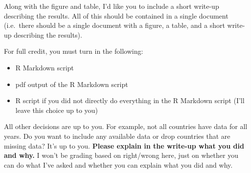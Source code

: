 \documentclass[
]{article}
\providecommand{\tightlist}{%
  \setlength{\itemsep}{0pt}\setlength{\parskip}{0pt}}
\begin{document}
Along with the figure and table, I'd like you to include a short write-up describing the results. All of this should be contained in a single document (i.e.~there should be a single document with a figure, a table, and a short write-up describing the results).

For full credit, you must turn in the following:

\begin{itemize}
\tightlist
\item
  R Markdown script
\item
  pdf output of the R Markdown script
\item
  R script if you did not directly do everything in the R Markdown script (I'll leave this choice up to you)
\end{itemize}

All other decisions are up to you. For example, not all countries have data for all years. Do you want to include any available data or drop countries that are missing data? It's up to you. \textbf{Please explain in the write-up what you did and why.} I won't be grading based on right/wrong here, just on whether you can do what I've asked and whether you can explain what you did and why.
\end{document}
